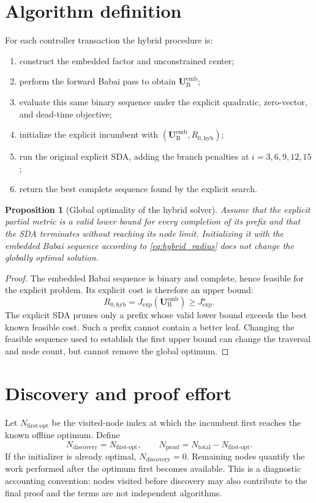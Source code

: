 \documentclass[paper=a4,oneside,fontsize=12pt,DIV=14,headings=normal,parskip=half,headsepline,numbers=noendperiod]{scrreprt}
\newcommand{\vct}[1]{\bm{#1}}
\newtheorem{proposition}{Proposition}[chapter]
\begin{document}
\section{Algorithm definition}
For each controller transaction the hybrid procedure is:
\begin{enumerate}
 \item construct the embedded factor and unconstrained center;
 \item perform the forward Babai pass to obtain
 $\vct U_{\mathrm B}^{\mathrm{emb}}$;
 \item evaluate this same binary sequence under the explicit quadratic,
 zero-vector, and dead-time objective;
 \item initialize the explicit incumbent with
 $(\vct U_{\mathrm B}^{\mathrm{emb}},R_{0,\mathrm{hyb}})$;
 \item run the original explicit SDA, adding the branch penalties at
 $i=3,6,9,12,15$;
 \item return the best complete sequence found by the explicit search.
\end{enumerate}

\begin{proposition}[Global optimality of the hybrid solver]
Assume that the explicit partial metric is a valid lower bound for every
completion of its prefix and that the SDA terminates without reaching its node
limit.  Initializing it with the embedded Babai sequence according to
\cref{eq:hybrid_radius} does not change the globally optimal solution.
\end{proposition}
\begin{proof}
The embedded Babai sequence is binary and complete, hence feasible for the
explicit problem.  Its explicit cost is therefore an upper bound:
\begin{equation}
 R_{0,\mathrm{hyb}}
 =J_{\mathrm{exp}}(\vct U_{\mathrm B}^{\mathrm{emb}})
 \ge J_{\mathrm{exp}}^\star.
\end{equation}
The explicit SDA prunes only a prefix whose valid lower bound exceeds the best
known feasible cost.  Such a prefix cannot contain a better leaf.  Changing
the feasible sequence used to establish the first upper bound can change the
traversal and node count, but cannot remove the global optimum.
\end{proof}

\section{Discovery and proof effort}
Let $N_{\mathrm{first\mbox{-}opt}}$ be the visited-node index at which the
incumbent first reaches the known offline optimum.  Define
\begin{equation}
 N_{\mathrm{discovery}}=N_{\mathrm{first\mbox{-}opt}},
 \qquad
 N_{\mathrm{proof}}=N_{\mathrm{total}}-N_{\mathrm{first\mbox{-}opt}}.
\end{equation}
If the initializer is already optimal, $N_{\mathrm{discovery}}=0$.  Remaining
nodes quantify the work performed after the optimum first becomes available.
This is a diagnostic accounting convention: nodes visited before discovery
may also contribute to the final proof and the terms are not independent
algorithms.
\end{document}
